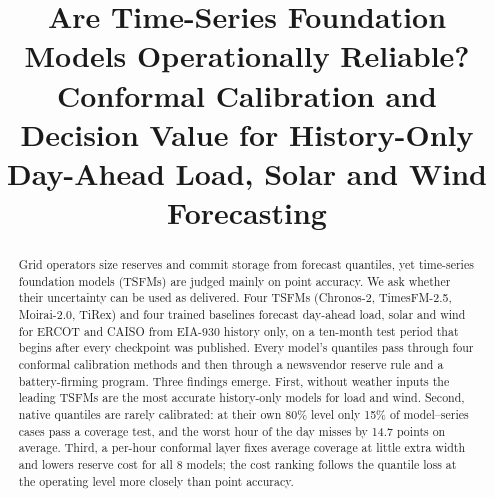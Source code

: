 \documentclass[conference]{IEEEtran}
\begin{document}
\title{Are Time-Series Foundation Models Operationally Reliable? Conformal Calibration and Decision Value for History-Only Day-Ahead Load, Solar and Wind Forecasting}

\author{
\and
{}
\and
{}
}

\maketitle

\begin{abstract}
Grid operators size reserves and commit storage from forecast quantiles, yet time-series foundation models (TSFMs) are judged mainly on point accuracy. We ask whether their uncertainty can be used as delivered. Four TSFMs (Chronos-2, TimesFM-2.5, Moirai-2.0, TiRex) and four trained baselines forecast day-ahead load, solar and wind for ERCOT and CAISO from EIA-930 history only, on a ten-month test period that begins after every checkpoint was published. Every model's quantiles pass through four conformal calibration methods and then through a newsvendor reserve rule and a battery-firming program. Three findings emerge. First, without weather inputs the leading TSFMs are the most accurate history-only models for load and wind. Second, native quantiles are rarely calibrated: at their own 80\% level only 15\% of model--series cases pass a coverage test, and the worst hour of the day misses by 14.7 points on average. Third, a per-hour conformal layer fixes average coverage at little extra width and lowers reserve cost for all 8 models; the cost ranking follows the quantile loss at the operating level more closely than point accuracy.
\end{abstract}
\end{document}
